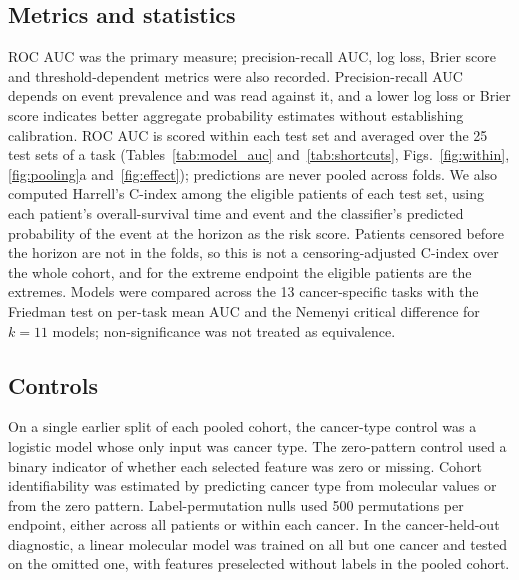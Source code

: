 \documentclass[11pt, a4paper, onecolumn, confidential, copyright]{hawkfranklin}
\begin{document}
\subsection*{Metrics and statistics}
ROC AUC was the primary measure; precision-recall AUC, log loss, Brier score and threshold-dependent metrics were also recorded. Precision-recall AUC depends on event prevalence and was read against it,\citep{saito2015precision} and a lower log loss or Brier score\citep{brier1950verification} indicates better aggregate probability estimates without establishing calibration.\citep{van2019calibration} ROC AUC is scored within each test set and averaged over the 25 test sets of a task (Tables~\ref{tab:model_auc} and~\ref{tab:shortcuts}, Figs.~\ref{fig:within}, \ref{fig:pooling}a and~\ref{fig:effect}); predictions are never pooled across folds. We also computed Harrell's C-index among the eligible patients of each test set, using each patient's overall-survival time and event and the classifier's predicted probability of the event at the horizon as the risk score. Patients censored before the horizon are not in the folds, so this is not a censoring-adjusted C-index over the whole cohort, and for the extreme endpoint the eligible patients are the extremes. Models were compared across the 13 cancer-specific tasks with the Friedman test on per-task mean AUC and the Nemenyi critical difference for $k = 11$ models;\citep{demsar2006statistical} non-significance was not treated as equivalence.

\subsection*{Controls}
On a single earlier split of each pooled cohort, the cancer-type control was a logistic model whose only input was cancer type. The zero-pattern control used a binary indicator of whether each selected feature was zero or missing. Cohort identifiability was estimated by predicting cancer type from molecular values or from the zero pattern. Label-permutation nulls used 500 permutations per endpoint, either across all patients or within each cancer. In the cancer-held-out diagnostic, a linear molecular model was trained on all but one cancer and tested on the omitted one, with features preselected without labels in the pooled cohort.
\end{document}
